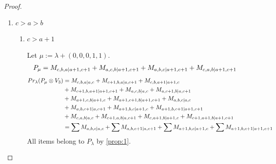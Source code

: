 \begin{proof}
\begin{enumerate}
    \item $c>a>b$
      \begin{enumerate}
        \item $c>a+1$\par
        Let $\mu:=\lambda + (0,0,0,1,1) $.
        \begin{equation}\notag
          \begin{aligned}
            P_\mu &= M_{c,b,a|a+1,c+1}
+ M_{a,c,b|a+1,c+1}
+ M_{a,b,c|a+1,c+1}
+ M_{c,a,b|a+1,c+1}
          \end{aligned}
        \end{equation}
        \begin{equation}\notag
          \begin{aligned}
            Pr_{\lambda}(P_\mu \otimes V_{3}) &=
M_{c,b,a|a,c}
+ M_{c+1,b,a|a,c+1}
+ M_{c,b,a+1|a+1,c}\\
                                              &
+ M_{c+1,b,a+1|a+1,c+1}
+ M_{a,c,b|a,c}
+ M_{a,c+1,b|a,c+1}\\
                                              &
+ M_{a+1,c,b|a+1,c}
+ M_{a+1,c+1,b|a+1,c+1}
+ M_{a,b,c|a,c}\\
                                              &
+ M_{a,b,c+1|a,c+1}
+ M_{a+1,b,c|a+1,c}
+ M_{a+1,b,c+1|a+1,c+1}\\
                                              &
+ M_{c,a,b|a,c}
+ M_{c+1,a,b|a,c+1}
+ M_{c,a+1,b|a+1,c}
+ M_{c+1,a+1,b|a+1,c+1} \\
                                               &=
\sum M_{a,b,c|a,c}
+ \sum M_{a,b,c+1|a,c+1}
+ \sum M_{a+1,b,c|a+1,c}
+ \sum M_{a+1,b,c+1|a+1,c+1}
          \end{aligned}
        \end{equation}
All items belong to $P_\lambda$ by \cref{prop:1}.


\end{enumerate}
\end{enumerate}
\end{proof}
